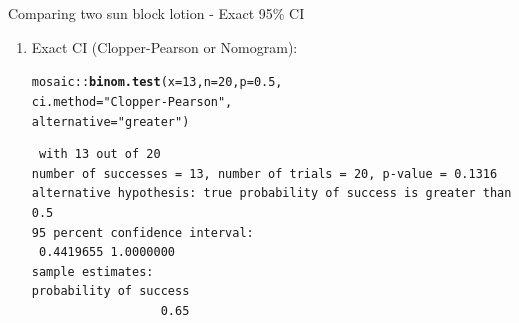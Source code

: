 \documentclass{beamer}\usepackage[]{graphicx}\usepackage[]{color}
\newcommand{\hlnum}[1]{\textcolor[rgb]{0.686,0.059,0.569}{#1}}%
\newcommand{\hlstr}[1]{\textcolor[rgb]{0.192,0.494,0.8}{#1}}%
\newcommand{\hlopt}[1]{\textcolor[rgb]{0,0,0}{#1}}%
\newcommand{\hlstd}[1]{\textcolor[rgb]{0.345,0.345,0.345}{#1}}%
\newcommand{\hlkwc}[1]{\textcolor[rgb]{0.333,0.667,0.333}{#1}}%
\newcommand{\hlkwd}[1]{\textcolor[rgb]{0.737,0.353,0.396}{\textbf{#1}}}%
\newenvironment{knitrout}{}{} %
\begin{document}
\begin{frame}[fragile]{Comparing two sun block lotion - Exact 95\% CI}
\small
\begin{enumerate}
	\setlength\itemsep{1em}
	
	\item Exact CI (Clopper-Pearson or Nomogram):
\begin{knitrout}\scriptsize
{}\color{fgcolor}
\begin{alltt}
\hlstd{mosaic}\hlopt{::}\hlkwd{binom.test}\hlstd{(}\hlkwc{x} \hlstd{=} \hlnum{13}\hlstd{,} \hlkwc{n} \hlstd{=} \hlnum{20}\hlstd{,} \hlkwc{p} \hlstd{=} \hlnum{0.5}\hlstd{,}
\hlkwc{ci.method} \hlstd{=} \hlstr{"Clopper-Pearson"}\hlstd{,}
\hlkwc{alternative} \hlstd{=} \hlstr{"greater"}\hlstd{)}
\end{alltt}
\begin{verbatim}
 with 13 out of 20 
number of successes = 13, number of trials = 20, p-value = 0.1316
alternative hypothesis: true probability of success is greater than 0.5 
95 percent confidence interval:
 0.4419655 1.0000000 
sample estimates:
probability of success 
                  0.65 
\end{verbatim}

\end{knitrout}
	

	
\end{enumerate}

\end{frame}
\end{document}
